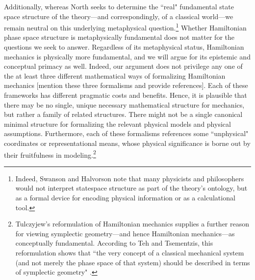 \documentclass[letterpaper]{article}
\begin{document}
Additionally, whereas North \parencites*[76]{North} seeks to determine the ``real" fundamental state space structure of the theory---and correspondingly, of a classical world---we remain neutral on this underlying metaphysical question.\footnote{Indeed, Swanson and Halvorson \parencites*[]{Swanson} note that many physicists and philosophers would not interpret statespace structure as part of the theory's ontology, but as a formal device for encoding physical information or as a calculational tool.} Whether Hamiltonian phase space structure is metaphysically fundamental does not matter for the questions we seek to answer. Regardless of its metaphysical status, Hamiltonian mechanics is physically more fundamental, and we will argue for its epistemic and conceptual primacy as well. Indeed, our argument does not privilege any one of the at least three different mathematical ways of formalizing Hamiltonian mechanics [mention these three formalisms and provide references]. Each of these frameworks has different pragmatic costs and benefits. Hence, it is plausible that there may be no single, unique necessary mathematical structure for mechanics, but rather a family of related structures. There might not be a single canonical minimal structure for formalizing the relevant physical models and physical assumptions. Furthermore, each of these formalisms references some ``unphysical" coordinates or representational means, whose physical significance is borne out by their fruitfulness in modeling.\footnote{Tulczyjew's reformulation of Hamiltonian mechanics supplies a further reason for viewing symplectic geometry---and hence Hamiltonian mechanics---as conceptually fundamental. According to Teh and Tsementzis, this reformulation shows that  ``the very concept of a classical mechanical system (and not merely the phase space of that system) should be described in terms of symplectic geometry" \parencites*[46]{Teh}.}
\end{document}

